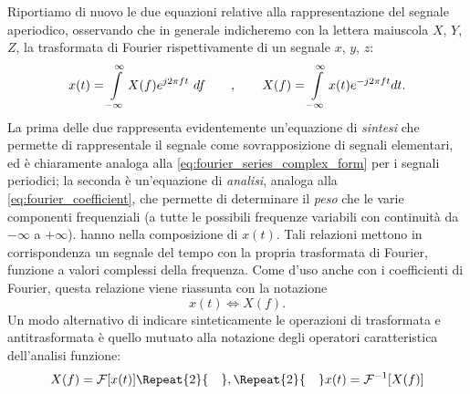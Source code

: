 \documentclass[12pt,oneside,openany]{memoir}
\numberwithin{equation}{subsection}
\newcommand{\quads}[1]{\Repeat{#1}{\quad}}
\newcommand{\df}{\ df}
\begin{document}
\bigbreak
Riportiamo di nuovo le due equazioni relative alla rappresentazione del segnale aperiodico, osservando che in generale indicheremo con la lettera maiuscola $X$, $Y$, $Z$, la trasformata di Fourier rispettivamente di un segnale $x$, $y$, $z$:
\begin{equation}
	x(t) = \int\displaylimits_{-\infty}^{\infty} X(f) e^{j 2 \pi f t} \df \quad\quad , \quad\quad X(f) = \int\displaylimits_{-\infty}^{\infty} x(t) e^{-j 2 \pi f t} dt.
\end{equation}
La prima delle due rappresenta evidentemente un'equazione di \textit{sintesi} che permette di rappresentale il segnale come sovrapposizione di segnali elementari, ed \`e chiaramente analoga alla \eqref{eq:fourier_series_complex_form} per i segnali periodici; la seconda \`e un'equazione di \textit{analisi}, analoga alla \eqref{eq:fourier_coefficient}, che permette di determinare il \textit{peso} che le varie componenti frequenziali (a tutte le possibili frequenze variabili con continuit\`a da $-\infty$ a $+\infty$). hanno nella composizione di $x(t)$. Tali relazioni mettono in corrispondenza un segnale del tempo con la propria trasformata di Fourier, funzione a valori complessi della frequenza. Come d'uso anche con i coefficienti di Fourier, questa relazione viene riassunta con la notazione
\begin{equation}
	x(t) \iff X(f).
\end{equation}
Un modo alternativo di indicare sinteticamente le operazioni di trasformata e antitrasformata \`e quello mutuato alla notazione degli operatori caratteristica dell'analisi funzione:
\begin{equation}
	X(f) = \mathcal{F}[x(t)] \quads{2} , \quads{2} x(t) = \mathcal{F}^{-1}[X(f)]
\end{equation}
\end{document}
